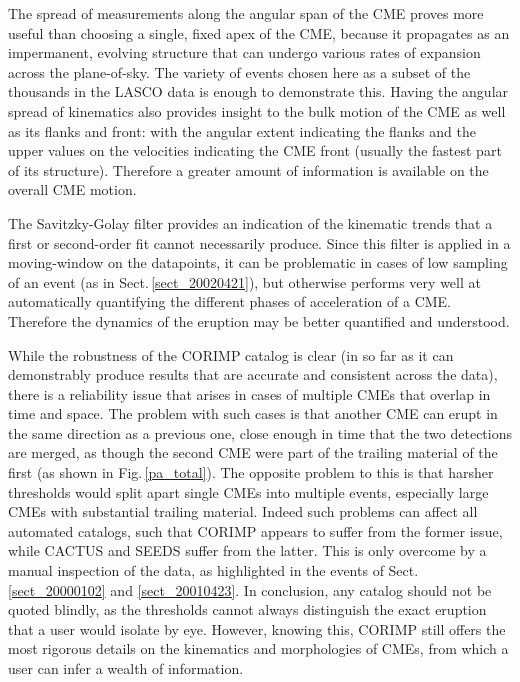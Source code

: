 \documentclass[referee,a4paper,12pt,traditabstract]{swsc}
\begin{document}
\begin{linenumbers}
The spread of measurements along the angular span of the CME proves more useful than choosing a single, fixed apex of the CME, because it propagates as an impermanent, evolving structure that can undergo various rates of expansion across the plane-of-sky. The variety of events chosen here as a subset of the thousands in the LASCO data is enough to demonstrate this. Having the angular spread of kinematics also provides insight to the bulk motion of the CME as well as its flanks and front: with the angular extent indicating the flanks and the upper values on the velocities indicating the CME front (usually the fastest part of its structure). Therefore a greater amount of information is available on the overall CME motion.

The Savitzky-Golay filter provides an indication of the kinematic trends that a first or second-order fit cannot necessarily produce. Since this filter is applied in a moving-window on the datapoints, it can be problematic in cases of low sampling of an event (as in Sect.\,\ref{sect_20020421}), but otherwise performs very well at automatically quantifying the different phases of acceleration of a CME. Therefore the dynamics of the eruption may be better quantified and understood.  

While the robustness of the CORIMP catalog is clear (in so far as it can demonstrably produce results that are accurate and consistent across the data), there is a reliability issue that arises in cases of multiple CMEs that overlap in time and space. The problem with such cases is that another CME can erupt in the same direction as a previous one, close enough in time that the two detections are merged, as though the second CME were part of the trailing material of the first (as shown in Fig.\,\ref{pa_total}). The opposite problem to this is that harsher thresholds would split apart single CMEs into multiple events, especially large CMEs with substantial trailing material. Indeed such problems can affect all automated catalogs, such that CORIMP appears to suffer from the former issue, while CACTUS and SEEDS suffer from the latter. This is only overcome by a manual inspection of the data, as highlighted in the events of Sect.\,\ref{sect_20000102} and \ref{sect_20010423}. In conclusion, any catalog should not be quoted blindly, as the thresholds cannot always distinguish the exact eruption that a user would isolate by eye. However, knowing this, CORIMP still offers the most rigorous details on the kinematics and morphologies of CMEs, from which a user can infer a wealth of information.


\end{linenumbers}
\end{document}
